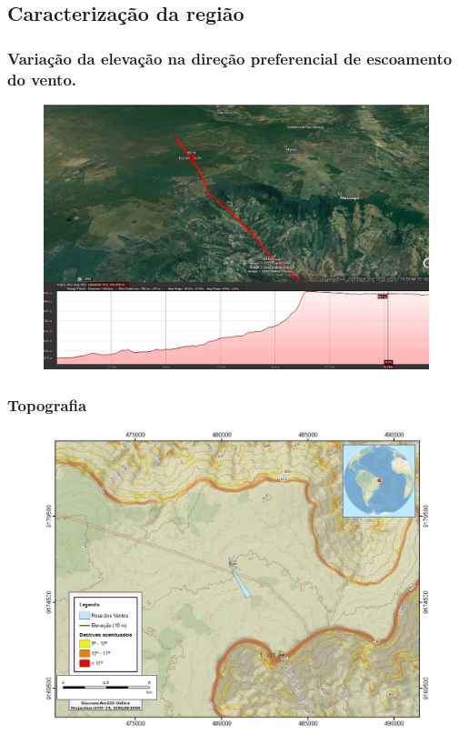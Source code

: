 \documentclass[mathserif,serif]{beamer}
\begin{document}
\subsection{Caracterização da região}

\begin{frame}
	\frametitle{Variação da elevação na direção preferencial de escoamento do vento.}
	\begin{figure}
		\centering
		\includegraphics[scale=0.19]{elevation2}
	\end{figure}
\end{frame}

\begin{frame}
	\frametitle{Topografia}
	\begin{figure}
		\centering
		\includegraphics[scale=0.35]{arcmap}
	\end{figure}
\end{frame}
\end{document}
